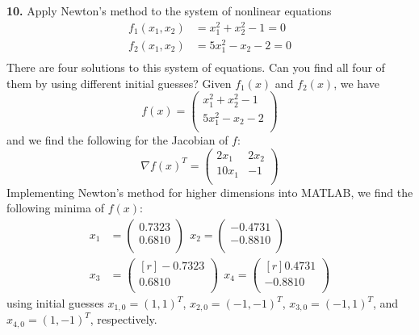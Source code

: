 \documentclass{article}
\begin{document}
    \textbf{10.} Apply Newton's method to the system of nonlinear equations
    \begin{align*}
        f_1(x_1,x_2) &= x_1^2 + x_2^2 - 1 = 0\\
        f_2(x_1,x_2) &= 5x_1^2 - x_2 - 2 = 0 \\
    \end{align*}
    There are four solutions to this system of equations. Can you find all four of them by using different initial guesses?
    \newline\newline
    Given $f_1(x)$ and $f_2(x)$, we have
    \[f(x) = \begin{pmatrix}
        x_1^2 + x_2^2 - 1 \\
        5x_1^2 - x_2 - 2 \\
    \end{pmatrix}\]
    and we find the following for the Jacobian of $f$:
    \[\nabla f(x)^T = \begin{pmatrix}
        2x_1 & 2x_2 \\
        10x_1 & -1 \\
    \end{pmatrix}\]
    Implementing Newton's method for higher dimensions into MATLAB, we find the following minima of $f(x)$:
    \begin{align*}
        x_1 &= \begin{pmatrix}
            0.7323\\
            0.6810 \\
        \end{pmatrix}
        \:\: x_2 = \begin{pmatrix}
            -0.4731\\
            -0.8810\\
        \end{pmatrix}\\
        x_3 &= \begin{pmatrix*}[r]
            -0.7323\\
            0.6810\\
        \end{pmatrix*}
        \:\: x_4 = \begin{pmatrix*}[r]
            0.4731\\
            -0.8810\\
        \end{pmatrix*}
    \end{align*}
    using initial guesses $x_{1,0} = (1,1)^T$, $x_{2,0} = (-1,-1)^T$, $x_{3,0} = (-1,1)^T$, and $x_{4,0} = (1,-1)^T$, respectively.
\end{document}
